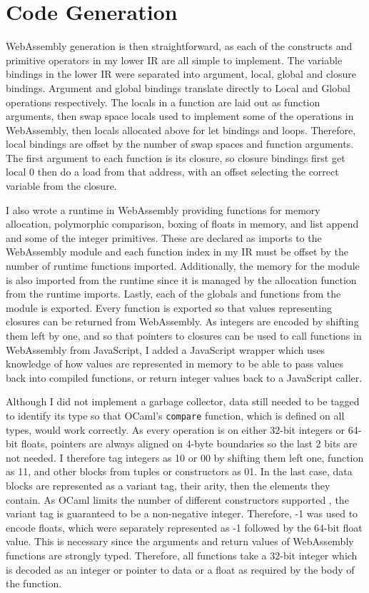 
\section{Code Generation}
WebAssembly generation is then straightforward, as each of the constructs and primitive operators in my lower IR are all simple to implement. The variable bindings in the lower IR were separated into argument, local, global and closure bindings. Argument and global bindings translate directly to Local and Global operations respectively. The locals in a function are laid out as function arguments, then swap space locals used to implement some of the operations in WebAssembly, then locals allocated above for let bindings and loops. Therefore, local bindings are offset by the number of swap spaces and function arguments. The first argument to each function is its closure, so closure bindings first get local 0 then do a load from that address, with an offset selecting the correct variable from the closure. 

I also wrote a runtime in WebAssembly providing functions for memory allocation, polymorphic comparison, boxing of floats in memory, and list append and some of the integer primitives. These are declared as imports to the WebAssembly module and each function index in my IR must be offset by the number of runtime functions imported. Additionally, the memory for the module is also imported from the runtime since it is managed by the allocation function from the runtime imports. Lastly, each of the globals and functions from the module is exported. Every function is exported so that values representing closures can be returned from WebAssembly. As integers are encoded by shifting them left by one, and so that pointers to closures can be used to call functions in WebAssembly from JavaScript, I added a JavaScript wrapper which uses knowledge of how values are represented in memory to be able to pass values back into compiled functions, or return integer values back to a JavaScript caller.

Although I did not implement a garbage collector, data still needed to be tagged to identify its type so that OCaml's \verb|compare| function, which is defined on all types, would work correctly. As every operation is on either 32-bit integers or 64-bit floats, pointers are always aligned on 4-byte boundaries so the last 2 bits are not needed. I therefore tag integers as 10 or 00 by shifting them left one, function as 11, and other blocks from tuples or constructors as 01. In the last case, data blocks are represented as a variant tag, their arity, then the elements they contain. As OCaml limits the number of different constructors supported%
, the variant tag is guaranteed to be a non-negative integer. Therefore, -1 was used to encode floats, which were separately represented as -1 followed by the 64-bit float value. This is necessary since the arguments and return values of WebAssembly functions are strongly typed. Therefore, all functions take a 32-bit integer which is decoded as an integer or pointer to data or a float as required by the body of the function.

